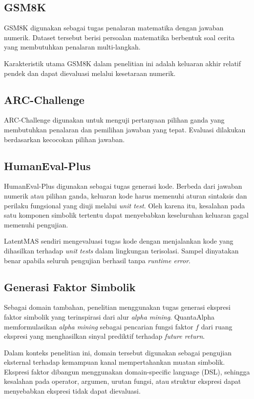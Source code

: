 \subsection{GSM8K}

GSM8K digunakan sebagai tugas penalaran matematika dengan jawaban numerik. Dataset tersebut berisi persoalan matematika berbentuk soal cerita yang membutuhkan penalaran multi-langkah.

Karakteristik utama GSM8K dalam penelitian ini adalah keluaran akhir relatif pendek dan dapat dievaluasi melalui kesetaraan numerik.

\subsection{ARC-Challenge}

ARC-Challenge digunakan untuk menguji pertanyaan pilihan ganda yang membutuhkan penalaran dan pemilihan jawaban yang tepat. Evaluasi dilakukan berdasarkan kecocokan pilihan jawaban.

\subsection{HumanEval-Plus}

HumanEval-Plus digunakan sebagai tugas generasi kode. Berbeda dari jawaban numerik atau pilihan ganda, keluaran kode harus memenuhi aturan sintaksis dan perilaku fungsional yang diuji melalui \textit{unit test}. Oleh karena itu, kesalahan pada satu komponen simbolik tertentu dapat menyebabkan keseluruhan keluaran gagal memenuhi pengujian.

LatentMAS sendiri mengevaluasi tugas kode dengan menjalankan kode yang dihasilkan terhadap \textit{unit tests} dalam lingkungan terisolasi. Sampel dinyatakan benar apabila seluruh pengujian berhasil tanpa \textit{runtime error}.

\subsection{Generasi Faktor Simbolik}

Sebagai domain tambahan, penelitian menggunakan tugas generasi ekspresi faktor simbolik yang terinspirasi dari alur \textit{alpha mining}. QuantaAlpha memformulasikan \textit{alpha mining} sebagai pencarian fungsi faktor \(f\) dari ruang ekspresi yang menghasilkan sinyal prediktif terhadap \textit{future return}.

Dalam konteks penelitian ini, domain tersebut digunakan sebagai pengujian eksternal terhadap kemampuan kanal mempertahankan muatan simbolik. Ekspresi faktor dibangun menggunakan domain-specific language (DSL), sehingga kesalahan pada operator, argumen, urutan fungsi, atau struktur ekspresi dapat menyebabkan ekspresi tidak dapat dievaluasi.

